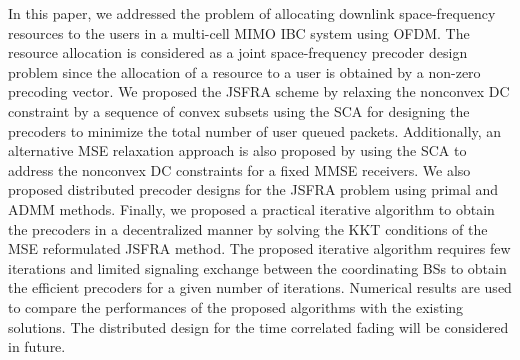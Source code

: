 In this paper, we addressed the problem of allocating downlink space-frequency resources to the users in a multi-cell \ac{MIMO} \ac{IBC} system using \ac{OFDM}. The resource allocation is considered as a joint space-frequency precoder design problem since the allocation of a resource to a user is obtained by a non-zero precoding vector. We proposed the \ac{JSFRA} scheme by relaxing the nonconvex \ac{DC} constraint by a sequence of convex subsets using the \ac{SCA} for designing the precoders to minimize the total number of user queued packets. Additionally, an alternative \ac{MSE} relaxation approach is also proposed by using the \ac{SCA} to address the nonconvex \ac{DC} constraints for a fixed \ac{MMSE} receivers. We also proposed distributed precoder designs for the \ac{JSFRA} problem using primal and \ac{ADMM} methods. Finally, we proposed a practical iterative algorithm to obtain the precoders in a decentralized manner by solving the \ac{KKT} conditions of the \ac{MSE} reformulated \ac{JSFRA} method.  The proposed iterative algorithm requires few iterations and limited signaling exchange between the coordinating \acp{BS} to obtain the efficient precoders for a given number of iterations. Numerical results are used to compare the performances of the proposed algorithms with the existing solutions. The distributed design for the time correlated fading will be considered in future.